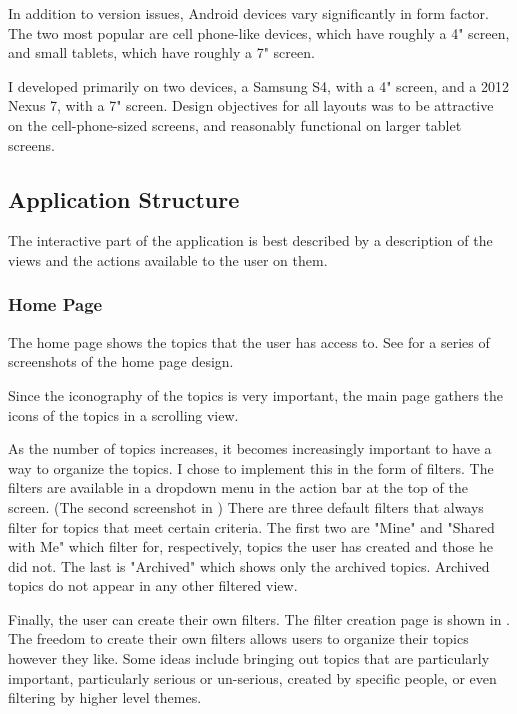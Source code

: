     In addition to version issues, Android devices vary significantly in form factor.
    The two most popular are cell phone-like devices, which have roughly a 4" screen,
    and small tablets, which have roughly a 7" screen.

    I developed primarily on two devices, a Samsung S4, with a 4" screen,
    and a 2012 Nexus 7, with a 7" screen.
    Design objectives for all layouts was to be attractive on the cell-phone-sized screens,
    and reasonably functional on larger tablet screens.

    \subsection{Application Structure}
    The interactive part of the application is best described by a description of the views
    and the actions available to the user on them.
      \subsubsection{Home Page}
      The home page shows the topics that the user has access to.
      See \cite{} for a series of screenshots of the home page design.

      Since the iconography of the topics is very important,
      the main page gathers the icons of the topics in a scrolling view.

      As the number of topics increases,
      it becomes increasingly important to have a way to organize the topics.
      I chose to implement this in the form of filters.
      The filters are available in a dropdown menu in the action bar at the top of the screen.
      (The second screenshot in \cite{})
      There are three default filters that always filter for topics that meet certain criteria.
      The first two are "Mine" and "Shared with Me"
      which filter for, respectively, topics the user has created and those he did not.
      The last is "Archived" which shows only the archived topics.
      Archived topics do not appear in any other filtered view.

      Finally, the user can create their own filters.
      The filter creation page is shown in \cite{}.
      The freedom to create their own filters allows users to organize
      their topics however they like.
      Some ideas include bringing out topics that are particularly important,
      particularly serious or un-serious, created by specific people,
      or even filtering by higher level themes.

